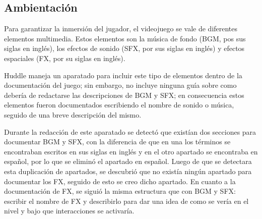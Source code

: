 \subsection{Ambientación}
	Para garantizar la inmersión del jugador, el videojuego se vale de diferentes elementos multimedia. Estos elementos son la música de fondo (BGM, pos sus siglas en inglés), los efectos de sonido (SFX, por sus siglas en inglés) y  efectos espaciales (FX, por su siglas en inglés).
\\
\par	
	Huddle maneja un aparatado para incluir este tipo de elementos dentro de la documentación del juego; sin embargo, no incluye ninguna guía sobre como debería de redactarse las descripciones de BGM y SFX; en consecuencia estos elementos fueron documentados escribiendo el nombre de sonido o música, seguido de una breve descripción del mismo.   
\\
\par
Durante la redacción de este aparatado se detectó que existían dos secciones para documentar BGM y SFX, con la diferencia de que en una los términos se encontraban escritos en sus siglas en inglés y en el otro apartado se encontraba en español, por lo que se eliminó el apartado en español. Luego de que se detectara esta duplicación de apartados, se descubrió que no existía ningún apartado para documentar los FX, seguido de esto se creo dicho apartado. En cuanto a la documentación de FX, se siguió la misma estructura que con BGM y SFX: escribir el nombre de FX y describirlo para dar una idea de como se vería en el nivel y bajo que interacciones se activaría. 
